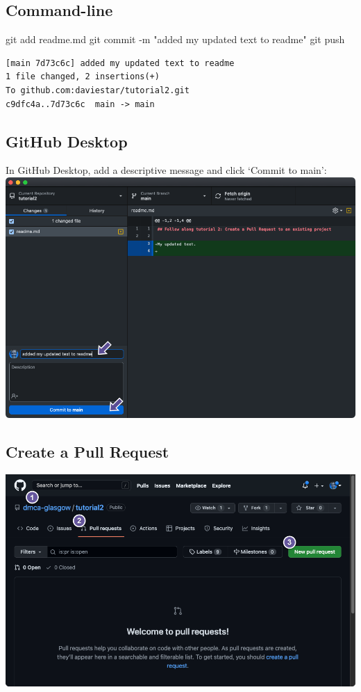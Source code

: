 \documentclass[
  letterpaper,
  DIV=11,
  numbers=noendperiod]{scrartcl}
\newenvironment{Shaded}{\begin{snugshade}}{\end{snugshade}}
\newcommand{\AttributeTok}[1]{\textcolor[rgb]{0.40,0.45,0.13}{#1}}
\newcommand{\FunctionTok}[1]{\textcolor[rgb]{0.28,0.35,0.67}{#1}}
\newcommand{\NormalTok}[1]{\textcolor[rgb]{0.00,0.23,0.31}{#1}}
\newcommand{\StringTok}[1]{\textcolor[rgb]{0.13,0.47,0.30}{#1}}
\begin{document}
\subsection{Command-line}

\begin{Shaded}
\begin{Highlighting}[]
\FunctionTok{git}\NormalTok{ add readme.md}
\FunctionTok{git}\NormalTok{ commit }\AttributeTok{{-}m} \StringTok{"added my updated text to readme"}
\FunctionTok{git}\NormalTok{ push}
\end{Highlighting}
\end{Shaded}

\begin{verbatim}
[main 7d73c6c] added my updated text to readme
1 file changed, 2 insertions(+)
To github.com:daviestar/tutorial2.git
c9dfc4a..7d73c6c  main -> main
\end{verbatim}

\subsection{GitHub Desktop}

In GitHub Desktop, add a descriptive message and click `Commit to main':
\includegraphics{images/image82.png}

\subsection{Create a Pull Request}\label{create-a-pull-request}

\includegraphics{images/image83.png}
\end{document}
